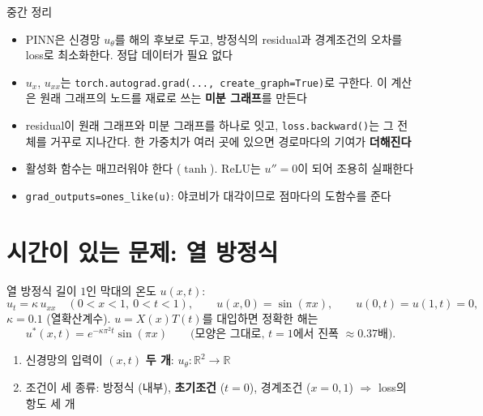 \documentclass[aspectratio=169,11pt]{beamer}
\newcommand{\R}{\mathbb{R}}
\begin{document}
\begin{frame}{중간 정리}
\begin{keybox}[중간 정리]
\begin{itemize}
\item PINN은 신경망 $u_\theta$를 해의 후보로 두고, 방정식의 residual과 경계조건의 오차를 loss로 최소화한다. 정답 데이터가 필요 없다
\item $u_x$, $u_{xx}$는 \texttt{torch.autograd.grad(..., create\_graph=True)}로 구한다. 이 계산은 원래 그래프의 노드를 재료로 쓰는 \textbf{미분 그래프}를 만든다
\item residual이 원래 그래프와 미분 그래프를 하나로 잇고, \texttt{loss.backward()}는 그 전체를 거꾸로 지나간다. 한 가중치가 여러 곳에 있으면 경로마다의 기여가 \textbf{더해진다}
\item 활성화 함수는 매끄러워야 한다 ($\tanh$). ReLU는 $u''=0$이 되어 조용히 실패한다
\item \texttt{grad\_outputs=ones\_like(u)}: 야코비가 대각이므로 점마다의 도함수를 준다
\end{itemize}
\end{keybox}
\end{frame}

\section{시간이 있는 문제: 열 방정식}

\begin{frame}{열 방정식}
길이 $1$인 막대의 온도 $u(x,t)$:
\[
u_t=\kappa\,u_{xx}\quad(0<x<1,\ 0<t<1),\qquad u(x,0)=\sin(\pi x),\qquad u(0,t)=u(1,t)=0,
\]
$\kappa=0.1$ (열확산계수). $u=X(x)T(t)$를 대입하면 정확한 해는
\[
u^*(x,t)=e^{-\kappa\pi^2t}\sin(\pi x)\qquad\text{(모양은 그대로, $t=1$에서 진폭 $\approx0.37$배)}.
\]
\vskip2mm
\begin{keybox}
\begin{enumerate}
\item 신경망의 입력이 $(x,t)$ \textbf{두 개}: $u_\theta:\R^2\to\R$
\item 조건이 세 종류: 방정식 (내부), \textbf{초기조건} ($t=0$), 경계조건 ($x=0,1$) $\Rightarrow$ loss의 항도 세 개
\end{enumerate}
\end{keybox}
\end{frame}
\end{document}
